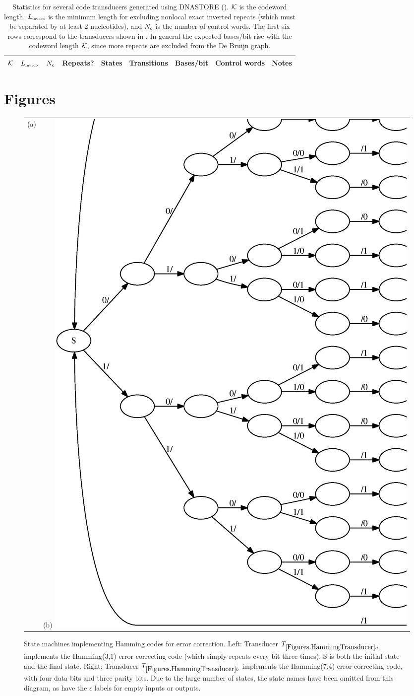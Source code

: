\documentclass[english]{article}
\begin{document}
\newpage
\begin{table}[h!t]
  \begin{tabular}{rrrrrrrll}
    ${\cal K}$ & $L_{\mbox{\tiny invrep}}$ & $N_c$ & Repeats? & States & Transitions & Bases/bit & Control words & Notes \\
    \hline

\end{tabular}
\caption{
  Statistics for several code transducers generated using DNASTORE ().
  ${\cal K}$ is the codeword length,
  $L_{\mbox{\tiny invrep}}$ is the minimum length for excluding nonlocal exact inverted repeats
  (which must be separated by at least 2 nucleotides),
  and $N_c$ is the number of control words.
  The first six rows correspond to the transducers shown in .
  In general the expected bases/bit rise with the codeword length ${\cal K}$,
  since more repeats are excluded from the De Bruijn graph.
}
\end{table}

\newpage
\section{Figures}

\newpage
\begin{figure}[h!t]
\begin{tabular}{ll}
(a) {hamming31}{width=.45\textwidth}
&
(b) \includegraphics[width=.45\textwidth]{hamming74.ps}
\end{tabular}
\caption{ 
State machines implementing Hamming codes for error correction.
Left:
Transducer $\hammingthreeone$ implements the Hamming(3,1) error-correcting code
(which simply repeats every bit three times).
S is both the initial state and the final state.
Right:
Transducer $\hammingsevenfour$ implements the Hamming(7,4) error-correcting code,
with four data bits and three parity bits.
Due to the large number of states, the state names have been omitted from this diagram,
as have the $\epsilon$ labels for empty inputs or outputs.
}
\end{figure}
\end{document}
